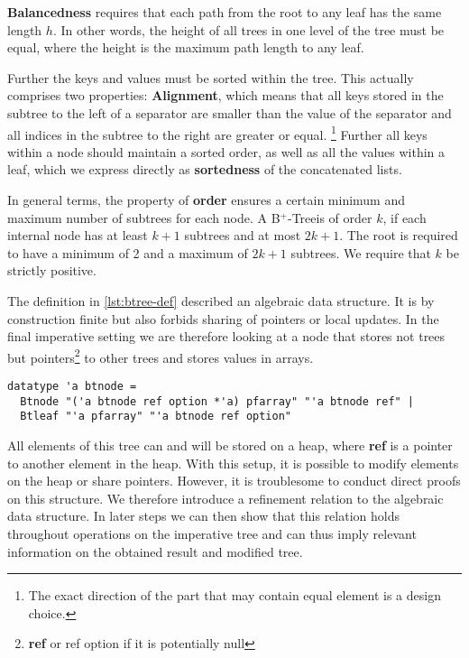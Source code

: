 \documentclass[a4paper,UKenglish,cleveref, autoref, thm-restate]{lipics-v2021}
\newcommand{\btree}{B$^+$-Tree}
\begin{document}
\textbf{Balancedness} requires
that each path from the root to any leaf has the same length $h$.
In other words, the height of all trees in one level of the tree must be equal,
where the height is the maximum path length to any leaf.

Further the keys and values must be sorted within the tree.
This actually comprises two properties: \textbf{Alignment}, which means that all keys stored
in the subtree to the left of a separator are smaller than the value of the separator
and all indices in the subtree to the right are greater or equal.
\footnote{
    The exact direction of the part that may contain equal element is a design choice.
}
Further all keys within a node should maintain a sorted order,
as well as all the values within a leaf, which we express directly
as \textbf{sortedness} of the concatenated lists.

In general terms, the property of \textbf{order} ensures a certain minimum and maximum
number of subtrees for each node.
A \btree is of order $k$, if each internal node has at least $k+1$
subtrees and at most $2k+1$.
The root is required to have a minimum of 2 and a maximum of $2k+1$ subtrees.
We require that $k$ be strictly positive.

The definition in \autoref{lst:btree-def} described an algebraic data structure.
It is by construction finite but also forbids sharing of pointers or local updates.
In the final imperative setting we are therefore looking at a node that stores not trees
but pointers\footnote{\textbf{ref} or ref option if it is potentially null} to other trees and stores values in arrays.

\begin{lstlisting}[mathescape=true, language=Isabelle,label=lst:btree-imp-def]
datatype 'a btnode =
  Btnode "('a btnode ref option *'a) pfarray" "'a btnode ref" |
  Btleaf "'a pfarray" "'a btnode ref option"
\end{lstlisting}

All elements of this tree can and will be stored on a heap, where \textbf{ref} is a pointer
to another element in the heap.
With this setup, it is possible to modify elements on the heap or share pointers.
However, it is troublesome to conduct direct proofs on this structure.
We therefore introduce a refinement relation to the algebraic data structure.
In later steps we can then show that this relation holds throughout operations on the imperative
tree and can thus imply relevant information on the obtained result and modified tree.
\end{document}
